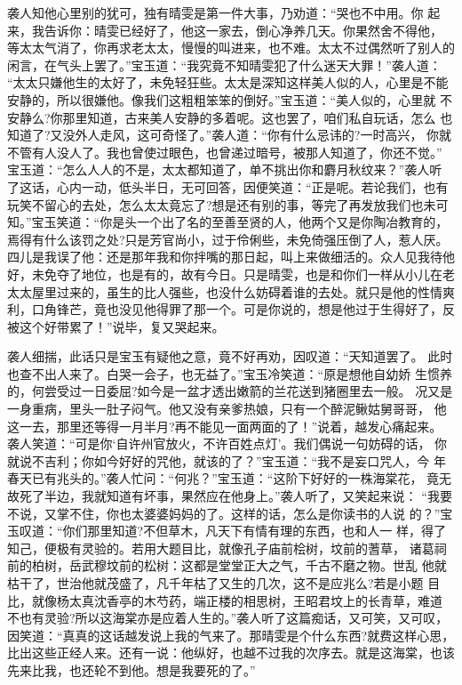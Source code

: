 袭人知他心里别的犹可，独有晴雯是第一件大事，乃劝道：“哭也不中用。你
起来，我告诉你：晴雯已经好了，他这一家去，倒心净养几天。你果然舍不得他，
等太太气消了，你再求老太太，慢慢的叫进来，也不难。太太不过偶然听了别人的
闲言，在气头上罢了。”宝玉道：“我究竟不知晴雯犯了什么迷天大罪！”袭人道：
“太太只嫌他生的太好了，未免轻狂些。太太是深知这样美人似的人，心里是不能
安静的，所以很嫌他。像我们这粗粗笨笨的倒好。”宝玉道：“美人似的，心里就
不安静么?你那里知道，古来美人安静的多着呢。这也罢了，咱们私自玩话，怎么
也知道了?又没外人走风，这可奇怪了。”袭人道：“你有什么忌讳的?一时高兴，
你就不管有人没人了。我也曾使过眼色，也曾递过暗号，被那人知道了，你还不觉。”
宝玉道：“怎么人人的不是，太太都知道了，单不挑出你和麝月秋纹来？”袭人听
了这话，心内一动，低头半日，无可回答，因便笑道：“正是呢。若论我们，也有
玩笑不留心的去处，怎么太太竟忘了?想是还有别的事，等完了再发放我们也未可
知。”宝玉笑道：“你是头一个出了名的至善至贤的人，他两个又是你陶冶教育的，
焉得有什么该罚之处?只是芳官尚小，过于伶俐些，未免倚强压倒了人，惹人厌。
四儿是我误了他：还是那年我和你拌嘴的那日起，叫上来做细活的。众人见我待他
好，未免夺了地位，也是有的，故有今日。只是晴雯，也是和你们一样从小儿在老
太太屋里过来的，虽生的比人强些，也没什么妨碍着谁的去处。就只是他的性情爽
利，口角锋芒，竟也没见他得罪了那一个。可是你说的，想是他过于生得好了，反
被这个好带累了！”说毕，复又哭起来。

袭人细揣，此话只是宝玉有疑他之意，竟不好再劝，因叹道：“天知道罢了。
此时也查不出人来了。白哭一会子，也无益了。”宝玉冷笑道：“原是想他自幼娇
生惯养的，何尝受过一日委屈?如今是一盆才透出嫩箭的兰花送到猪圈里去一般。
况又是一身重病，里头一肚子闷气。他又没有亲爹热娘，只有一个醉泥鳅姑舅哥哥，
他这一去，那里还等得一月半月?再不能见一面两面的了！”说着，越发心痛起来。
袭人笑道：“可是你‘自许州官放火，不许百姓点灯’。我们偶说一句妨碍的话，
你就说不吉利；你如今好好的咒他，就该的了？”宝玉道：“我不是妄口咒人，今
年春天已有兆头的。”袭人忙问：“何兆？”宝玉道：“这阶下好好的一株海棠花，
竟无故死了半边，我就知道有坏事，果然应在他身上。”袭人听了，又笑起来说：
“我要不说，又掌不住，你也太婆婆妈妈的了。这样的话，怎么是你读书的人说
的？”宝玉叹道：“你们那里知道?不但草木，凡天下有情有理的东西，也和人一
样，得了知己，便极有灵验的。若用大题目比，就像孔子庙前桧树，坟前的蓍草，
诸葛祠前的柏树，岳武穆坟前的松树：这都是堂堂正大之气，千古不磨之物。世乱
他就枯干了，世治他就茂盛了，凡千年枯了又生的几次，这不是应兆么?若是小题
目比，就像杨太真沈香亭的木芍药，端正楼的相思树，王昭君坟上的长青草，难道
不也有灵验?所以这海棠亦是应着人生的。”袭人听了这篇痴话，又可笑，又可叹，
因笑道：“真真的这话越发说上我的气来了。那晴雯是个什么东西?就费这样心思，
比出这些正经人来。还有一说：他纵好，也越不过我的次序去。就是这海棠，也该
先来比我，也还轮不到他。想是我要死的了。”

